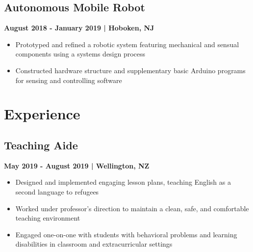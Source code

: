 \documentclass[a4paper, 11pt]{article}
\newenvironment{tightemize}{
\vspace{-\topsep}\begin{itemize}[leftmargin=1em]\itemsep1pt \parskip0pt \parsep0pt}
{\end{itemize}\vspace{-\topsep}}
\begin{document}
\begin{minipage}[h]{0.63\textwidth}
\subsection{Autonomous Mobile Robot\\}
\hspace{-6pt}\vspace{0.8em}\textbf{\textcolor{location}{August 2018 - January 2019 | Hoboken, NJ}}\\
\vspace{-0.5em}
\begin{tightemize}
\fontsize{10}{0}\selectfont
\item{\textcolor{location}{Prototyped and refined a robotic system featuring mechanical and sensual components using a systems design process}}
\item{\textcolor{location}{Constructed hardware structure and supplementary basic Arduino programs for sensing and controlling software}}
\end{tightemize}
\vspace{-1em}
\section{Experience}
\subsection{Teaching Aide\\}
\hspace{-6pt}\vspace{0.8em}\textbf{\textcolor{location}{May 2019 - August 2019 | Wellington, NZ}}\\
\vspace{-0.5em}
\begin{tightemize}
\item{\textcolor{location}{Designed and implemented engaging lesson plans, teaching English as a second language to refugees}}
\item{\textcolor{location}{Worked under professor’s direction to maintain a clean, safe, and comfortable teaching environment}}
\item{\textcolor{location}{Engaged one-on-one with students with behavioral problems and learning disabilities in classroom and extracurricular settings}}
\end{tightemize}
\vspace{-1em}

\end{minipage}
\end{document}
